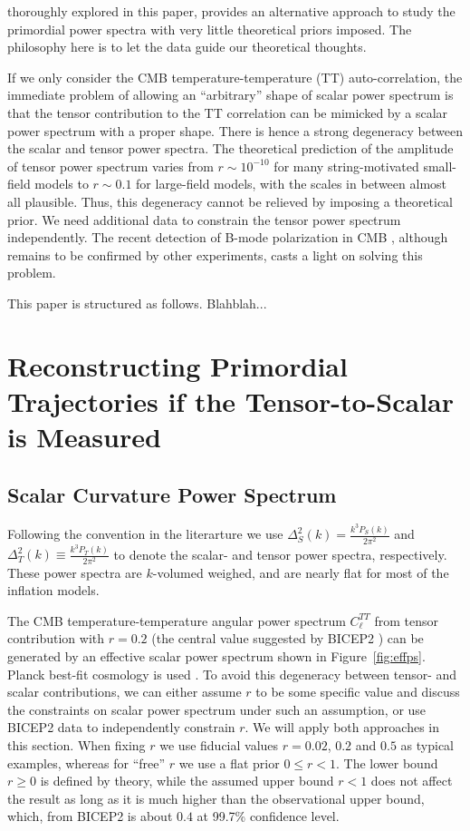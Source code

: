 \documentclass[11pt]{article}
\begin{document}
thoroughly explored in this paper, provides an alternative approach to study the primordial power spectra with very little theoretical priors imposed. The philosophy here is to let the data guide our theoretical thoughts.

If we only consider the CMB temperature-temperature (TT) auto-correlation, the immediate problem of allowing an ``arbitrary'' shape of scalar power spectrum is that the tensor contribution to the TT correlation can be mimicked by a scalar power spectrum with a proper shape. There is hence a strong degeneracy between the scalar and tensor power spectra. The theoretical prediction of the amplitude of tensor power spectrum varies from $r\sim 10^{-10}$ for many string-motivated small-field models to  $r\sim 0.1$ for large-field models, with the scales in between almost all plausible. Thus, this degeneracy cannot be relieved by imposing a theoretical prior. We need additional data to constrain the tensor power spectrum independently. The recent detection of B-mode polarization in CMB \cite{BICEP2}, although remains to be confirmed by other experiments, casts a light on solving this problem.

This paper is structured as follows. Blahblah...

\section{Reconstructing Primordial Trajectories if the Tensor-to-Scalar is Measured}

\subsection{Scalar Curvature Power Spectrum }

Following the convention in the literarture we use $\Delta^2_{S}(k) = \frac{k^3P_S(k)}{2\pi^2}$ and $\Delta^2_T(k) \equiv \frac{k^3P_T(k)}{2\pi^2}$ to denote the scalar- and tensor power spectra, respectively. These power spectra are $k$-volumed weighed, and are nearly flat for most of the inflation models.

The CMB temperature-temperature angular power spectrum $C_\ell^{TT}$ from tensor contribution with $r=0.2$ (the central value suggested by BICEP2 \cite{BICEP2}) can be generated by an effective scalar power spectrum shown in Figure~\ref{fig:effps}. Planck best-fit cosmology is used \cite{Planck2013Parameters}.  To avoid this degeneracy between tensor- and scalar contributions, we can either assume $r$ to be some specific value and discuss the constraints on scalar power spectrum under such an assumption, or use BICEP2 data to independently constrain $r$. We will apply both approaches in this section. When fixing $r$ we use fiducial values $r=0.02$,  $0.2$ and $0.5$ as typical examples, whereas for ``free'' $r$ we use a flat prior $0\le r < 1$. The lower bound $r\ge 0$ is defined by theory, while the assumed upper bound $r<1$ does not affect the result as long as it is much higher than the observational upper bound, which, from BICEP2 is about $0.4$ at 99.7\% confidence level.   
\end{document}
